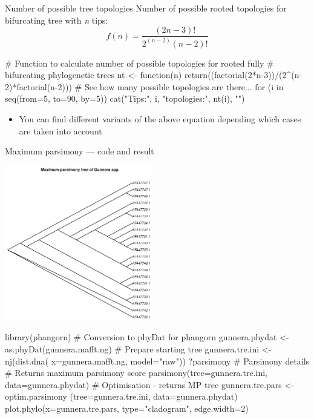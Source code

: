 \documentclass[compress, xelatex, 11pt, xcolor=svgnames, aspectratio=169,
	hyperref={
		bookmarks=true,
		unicode=true,
		colorlinks=true,
		pdftitle={Molecular data in R},
		plainpages=false,
		pdfauthor={Vojtech Zeisek},
		pdfsubject={Course about phylogeny and evolution in R},
		pdfcreator={XeLaTeX},
		pdfkeywords={R, evolution, phylogeny, molecular data},
		linkcolor=Crimson, %
		anchorcolor=Magenta, %
		citecolor=Magenta, %
		filecolor=Magenta, %
		menucolor=Magenta, %
		urlcolor=DodgerBlue, %
		},
	url={hyphens, lowtilde} %
	]{beamer}
\begin{document}
\begin{frame}[fragile]{Number of possible tree topologies}
	Number of possible rooted topologies for bifurcating tree with \textit{n} tips:
	\begin{equation}
		f\left(n\right) = \frac{(2n-3)!}{2^{(n-2)}(n-2)!}
	\end{equation}	
	\begin{spluscode}
    # Function to calculate number of possible topologies for rooted fully
    # bifurcating phylogenetic trees
    nt <- function(n) { return((factorial(2*n-3))/(2^(n-2)*factorial(n-2))) }
    # See how many possible topologies are there...
    for (i in seq(from=5, to=90, by=5)) {
      cat("Tips:", i, "topologies:", nt(i), "\n")
      }
	\end{spluscode}
	\begin{itemize}
		\item You can find different variants of the above equation depending which cases are taken into account
	\end{itemize}
\end{frame}

\begin{frame}[fragile]{Maximum parsimony --- code and result}
	\begin{multicols}{2}
		\begin{center}
			\includegraphics[height=6.75cm]{parsimony.png}
		\end{center}
		\begin{spluscode}
    library(phangorn)
    # Conversion to phyDat for phangorn
    gunnera.phydat <-
      as.phyDat(gunnera.mafft.ng)
    # Prepare starting tree
    gunnera.tre.ini <- nj(dist.dna(
      x=gunnera.mafft.ng, model="raw"))
    ?parsimony # Parsimony details
    # Returns maximum parsimony score
    parsimony(tree=gunnera.tre.ini,
      data=gunnera.phydat)
    # Optimisation - returns MP tree
    gunnera.tre.pars <- optim.parsimony
      (tree=gunnera.tre.ini,
      data=gunnera.phydat)
    plot.phylo(x=gunnera.tre.pars,
      type="cladogram", edge.width=2)
		\end{spluscode}
	\end{multicols}
\end{frame}
\end{document}

